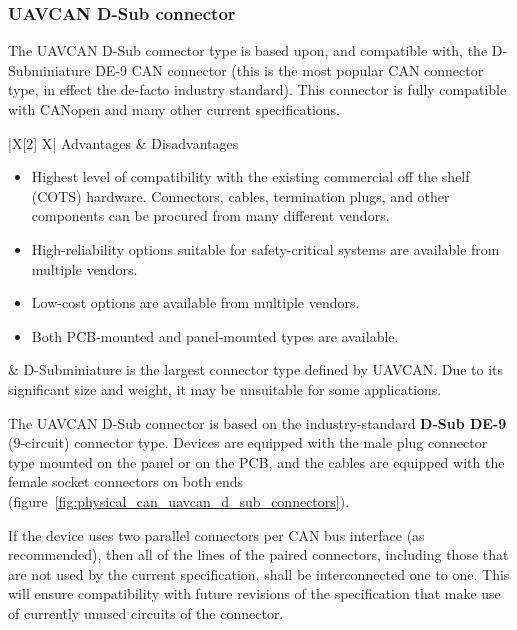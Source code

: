 \clearpage  %
\subsubsection{UAVCAN D-Sub connector}

The UAVCAN D-Sub connector type is based upon, and compatible with, the D-Subminiature DE-9 CAN connector
(this is the most popular CAN connector type, in effect the de-facto industry standard).
This connector is fully compatible with CANopen and many other current specifications.

{
\NoLeftSkip
\begin{UAVCANCompactTable}{|X[2] X|}
    Advantages & Disadvantages \\
    \begin{itemize}
        \item Highest level of compatibility with the existing commercial off the shelf (COTS) hardware.
        Connectors, cables, termination plugs, and other components can be procured from many different vendors.
        \item High-reliability options suitable for safety-critical systems are available from multiple vendors.
        \item Low-cost options are available from multiple vendors.
        \item Both PCB-mounted and panel-mounted types are available.
    \end{itemize}
    &
    D-Subminiature is the largest connector type defined by UAVCAN.
    Due to its significant size and weight, it may be unsuitable for some applications.
\end{UAVCANCompactTable}
}

The UAVCAN D-Sub connector is based on the industry-standard \textbf{D-Sub DE-9} (9-circuit) connector type.
Devices are equipped with the male plug connector type mounted on the panel or on the PCB,
and the cables are equipped with the female socket connectors on both ends
(figure~\ref{fig:physical_can_uavcan_d_sub_connectors}).

If the device uses two parallel connectors per CAN bus interface (as recommended),
then all of the lines of the paired connectors,
including those that are not used by the current specification,
shall be interconnected one to one.
This will ensure compatibility with future revisions of the specification that make use of
currently unused circuits of the connector.

